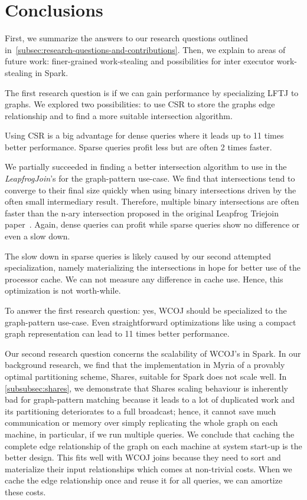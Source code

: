 \section{Conclusions} \label{sec:conclusions}

First, we summarize the answers to our research questions outlined in~\cref{subsec:research-questions-and-contributions}.
Then, we explain to areas of future work: finer-grained work-stealing and possibilities for inter executor work-stealing in Spark.

The first research question is if we can gain performance by specializing \textsc{LFTJ} to graphs.
We explored two possibilities: to use \textsc{CSR} to store the graphs edge relationship and to find a more suitable
intersection algorithm.

Using \textsc{CSR} is a big advantage for dense queries where it leads up to 11 times better performance.
Sparse queries profit less but are often 2 times faster.

We partially succeeded in finding a better intersection algorithm to use in the \textit{LeapfrogJoin}'s for the graph-pattern use-case.
We find that intersections tend to converge to their final size quickly when using binary intersections driven by the often small
intermediary result.
Therefore, multiple binary intersections are often faster than the n-ary intersection proposed in the original Leapfrog Triejoin
paper~\cite{lftj}.
Again, dense queries can profit while sparse queries show no difference or even a slow down.

The slow down in sparse queries is likely caused by our second attempted specialization, namely materializing the intersections in
hope for better use of the processor cache.
We can not measure any difference in cache use.
Hence, this optimization is not worth-while.

To answer the first research question: yes, \textsc{WCOJ} should be specialized to the graph-pattern
use-case.
Even straightforward optimizations like using a compact graph representation can lead to 11 times
better performance.

Our second research question concerns the scalability of \textsc{WCOJ}'s in Spark.
In our background research, we find that the implementation in Myria of a provably optimal partitioning scheme, Shares, suitable for
Spark does not scale well.
In \cref{subsubsec:shares}, we demonstrate that Shares scaling behaviour is inherently bad for graph-pattern matching because
it leads to a lot of duplicated work and its partitioning deteriorates to a full broadcast;
hence, it cannot save much communication or memory over simply replicating the whole graph on each machine, in particular, if
we run multiple queries.
We conclude that caching the complete edge relationship of the graph on each machine at system start-up is the better design.
This fits well with \textsc{WCOJ} joins because they need to sort and materialize their input relationships which comes at non-trivial
costs.
When we cache the edge relationship once and reuse it for all queries, we can amortize these costs.

